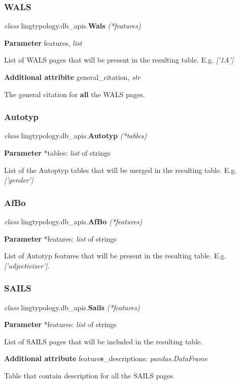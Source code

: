 \documentclass[a4paper,12pt]{article}
\begin{document}
\subsubsection{WALS}

\textit{class} lingtypology.db\_apis.\textbf{Wals} \textit{(*features)}
\medskip

\textbf{Parameter} features, \textit{list}

List of WALS pages that will be present in the resulting table. E.g. \textit{['1A']}
\medskip

\textbf{Additional attribite} general\_citation, \textit{str}

The general citation for \textbf{all} the WALS pages.

\subsubsection{Autotyp}

\textit{class} lingtypology.db\_apis.\textbf{Autotyp} \textit{(*tables)}
\medskip

\textbf{Parameter} *tables: \textit{list} of strings

List of the Autoptyp tables that will be merged in the resulting table. E.g. \textit{['gender']}

\subsubsection{AfBo}
\textit{class} lingtypology.db\_apis.\textbf{AfBo} \textit{(*features)}
\medskip

\textbf{Parameter} *features: \textit{list} of strings

List of Autotyp features that will be present in the resulting table. E.g. \textit{['adjectivizer']}.

\subsubsection{SAILS}

\textit{class} lingtypology.db\_apis.\textbf{Sails} \textit{(*features)}
\medskip

\textbf{Parameter} *features: \textit{list} of strings

List of SAILS pages that will be included in the resulting table.
\medskip

\textbf{Additional attribute} feature\textbf{s}\_descriptions: \textit{pandas.DataFrame}

Table that contain description for all the SAILS pages.
\medskip
\end{document}
